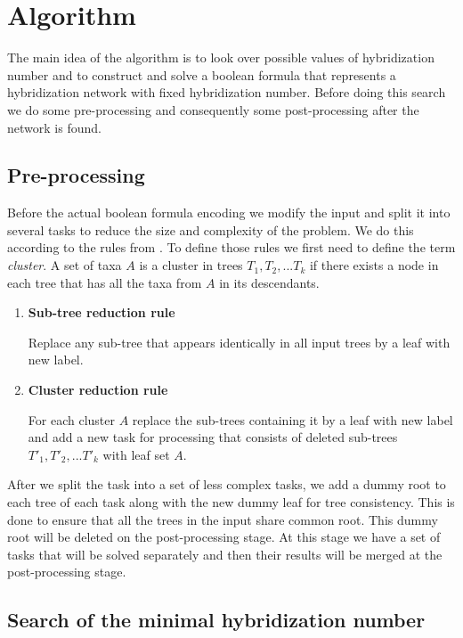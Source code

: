 \documentclass[runningheads, envcountsame, a4paper]{llncs}
\begin{document}
\section{Algorithm}

The main idea of the algorithm is to look over possible values of hybridization number and to construct and solve a boolean 
formula that represents a hybridization network with fixed hybridization number. Before doing this search we do some 
pre-processing and consequently some post-processing after the network is found.

\subsection{Pre-processing}

Before the actual boolean formula encoding we modify the input and split it into several tasks to reduce the size 
and complexity of the problem. We do this according to the rules from \cite {bonet2009efficiently}. To define those 
rules we first need to define the term \emph{cluster}. A set of taxa $A$ is a cluster in trees $T_1, T_2, ... T_k$ if there 
exists a node in each tree that has all the taxa from $A$ in its descendants.

\begin{enumerate}

\item \textbf{Sub-tree reduction rule}

Replace any sub-tree that appears identically in all input trees by a leaf with new label.

\item \textbf{Cluster reduction rule}

For each cluster $A$ replace the sub-trees containing it by a leaf with new label and add a new task for processing 
that consists of deleted sub-trees $T'_1, T'_2, ... T'_k$ with leaf set $A$.

\end{enumerate}

After we split the task into a set of less complex tasks, we add a dummy root to each tree of each task along with 
the new dummy leaf for tree consistency. This is done to ensure that all the trees in the input share common root. 
This dummy root will be deleted on the post-processing stage. At this stage we have a set of tasks that will be solved 
separately and then their results will be merged at the post-processing stage.

\subsection{Search of the minimal hybridization number}
\end{document}
